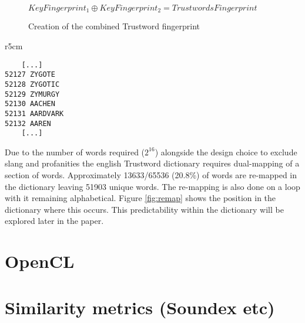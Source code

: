 \begin{figure}[h!]
    \centering
    $KeyFingerprint_{1} \oplus KeyFingerprint_{2} = TrustwordsFingerprint$
    \caption{Creation of the combined Trustword fingerprint}
\end{figure}

\begin{wrapfigure}{r}{5cm}
    \centering
    \begin{BVerbatim}
    [...]
52127 ZYGOTE
52128 ZYGOTIC
52129 ZYMURGY
52130 AACHEN
52131 AARDVARK
52132 AAREN
    [...]
    \end{BVerbatim}
    \caption{Re-mapping position in Trustword dictionary}
    \label{fig:remap}
\end{wrapfigure}

Due to the number of words required ($2^{16}$) alongside the design choice to exclude slang and profanities the english Trustword dictionary requires dual-mapping of a section of words. Approximately 13633/65536 (20.8\%) of words are re-mapped in the dictionary leaving 51903 unique words. The re-mapping is also done on a loop with it remaining alphabetical. Figure \ref{fig:remap} shows the position in the dictionary where this occurs. This predictability within the dictionary will be explored later in the paper.




\section{OpenCL}

\section{Similarity metrics (Soundex etc)}